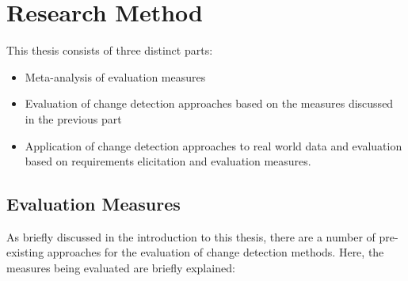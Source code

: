 \documentclass{uvamscse}	%
\begin{document}
\chapter{Research Method}
\label{Research Method}

This thesis consists of three distinct parts:

\begin{itemize}
  \item Meta-analysis of evaluation measures
  \item Evaluation of change detection approaches based on the measures discussed in the previous part
  \item Application of change detection approaches to real world data and evaluation based on requirements elicitation and evaluation measures.
\end{itemize}


\section{Evaluation Measures}

As briefly discussed in the introduction to this thesis, there are a number of pre-existing approaches for the evaluation of change detection methods. Here, the measures being evaluated are briefly explained:
\end{document}
